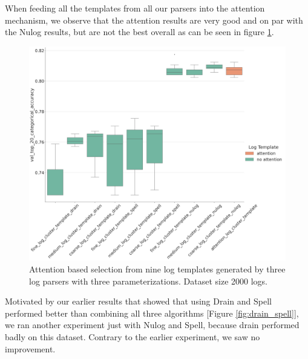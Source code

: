 When feeding all the templates from all our parsers into the attention mechanism, we observe that the attention results are very good and on par with the Nulog results, but are not the best overall as can be seen in figure \ref{fig:all_hdfs}.
\begin{figure}[H]
    \centering
    \includegraphics[keepaspectratio=true,scale=0.2]{figures/5_results/all_hdfs.png}
    \caption{Attention based selection from nine log templates generated by three log parsers with three parameterizations. Dataset size 2000 logs.}
    \label{fig:all_hdfs}
\end{figure}

Motivated by our earlier results that showed that using Drain and Spell performed better than combining all three algorithms [Figure \ref{fig:drain_spell}], we ran another experiment just with Nulog and Spell, because drain performed badly on this dataset. Contrary to the earlier experiment, we saw no improvement. 

